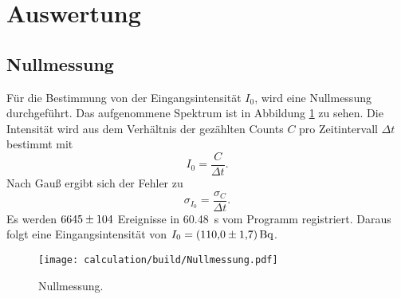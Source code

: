 \newpage
\section{Auswertung}
\label{sec:Auswertung}
\subsection{Nullmessung}
Für die Bestimmung von der Eingangsintensität $I_0$, wird eine Nullmessung durchgeführt.
Das aufgenommene Spektrum ist in Abbildung \ref{fig:Nullmessung} zu sehen.
Die Intensität wird aus dem Verhältnis der gezählten Counts $C$ pro Zeitintervall $\Delta t$ bestimmt mit
\begin{equation}
    I_0=\frac{C}{\Delta t}.
\end{equation}
Nach Gauß ergibt sich der Fehler zu
\begin{equation}
    \sigma_{I_0}=\frac{\sigma_C}{\Delta t}.
\end{equation}
Es werden $\num{6645\pm104}$ Ereignisse in \SI{60,48}{\second} vom Programm registriert.
Daraus folgt eine Eingangsintensität von $I_0=\SI{110.0\pm1.7}{\becquerel}$.

 \begin{figure}[htb]
   \centering
   \texttt{[image: calculation/build/Nullmessung.pdf]}
   \caption{Nullmessung.}
   \label{fig:Nullmessung}
 \end{figure}
